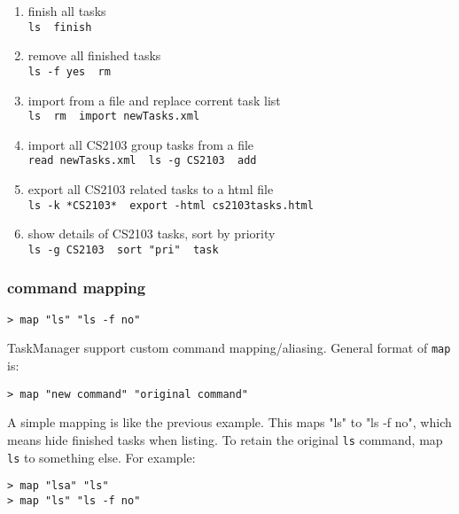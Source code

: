 \documentclass[12pt, a4paper]{article}
\begin{document}
\begin{enumerate}
\item finish all tasks\\
  \texttt{ls \textbar \  finish}

\item remove all finished tasks\\
  \texttt{ls -f yes \textbar \  rm}

\item import from a file and replace corrent task list\\
  \texttt{ls \textbar \  rm \textbar \  import newTasks.xml}

\item import all CS2103 group tasks from a file\\
  \texttt{read newTasks.xml \textbar \  ls -g CS2103 \textbar \  add}

\item export all CS2103 related tasks to a html file\\
  \texttt{ls -k *CS2103* \textbar \  export -html cs2103tasks.html}

\item show details of CS2103 tasks, sort by priority\\
  \texttt{ls -g CS2103 \textbar \  sort "pri" \textbar \  task}
\end{enumerate}

\subsubsection{command mapping}

\noindent \texttt{\textgreater \ map "ls" "ls -f no"}

TaskManager support custom command mapping/aliasing. General format of \texttt{map} is:

\noindent \texttt{\textgreater \ map "new command" "original command"}

A simple mapping is like the previous example. This maps "ls" to "ls -f no", which means hide finished tasks when listing.
To retain the original \texttt{ls} command, map \texttt{ls} to something else. For example:

\noindent \texttt{\textgreater \ map "lsa" "ls"\\
  \textgreater \ map "ls" "ls -f no" \footnotemark}

\end{document}
